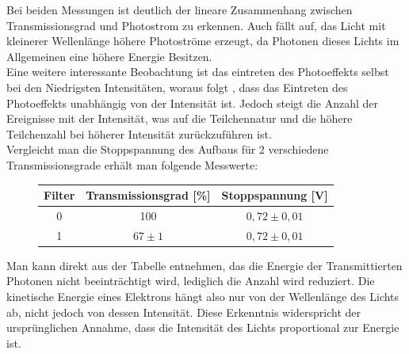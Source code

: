 \documentclass{scrartcl}
\begin{document}
		Bei beiden Messungen ist deutlich der lineare Zusammenhang zwischen Transmissionsgrad und Photostrom zu erkennen.
		Auch fällt auf, das Licht mit kleinerer Wellenlänge höhere Photoströme erzeugt, da Photonen dieses Lichts im Allgemeinen
		eine höhere Energie Besitzen. \\
		Eine weitere interessante Beobachtung ist das eintreten des Photoeffekts selbst bei den Niedrigsten Intensitäten, woraus folgt
		, dass das Eintreten des Photoeffekts unabhängig von der Intensität ist. Jedoch steigt die Anzahl der Ereignisse mit der Intensität,
		was auf die Teilchennatur und die höhere Teilchenzahl bei höherer Intensität zurückzuführen ist.\\
		Vergleicht man die Stoppspannung des Aufbaus für 2 verschiedene Transmissionsgrade erhält man folgende Messwerte:
		\begin{figure}[H]
			\centering
			\begin{tabular}{|c|c|c|}
				\hline
				Filter & Transmissionsgrad [\%] & Stoppspannung [V] \\
				\hline
				0 & 100 & $0,72\pm 0,01$ \\ 
				1 & $67\pm 1$ & $0,72\pm 0,01$ \\
				\hline
			\end{tabular}
		\end{figure}
		Man kann direkt aus der Tabelle entnehmen, das die Energie der Transmittierten Photonen nicht beeinträchtigt wird, lediglich die 
		Anzahl wird reduziert. Die kinetische Energie eines Elektrons hängt also nur von der Wellenlänge des Lichts ab, nicht jedoch von
		dessen Intensität. Diese Erkenntnis widerspricht der ursprünglichen Annahme, dass die Intensität 
		des Lichts proportional zur Energie ist.
		
\end{document}

